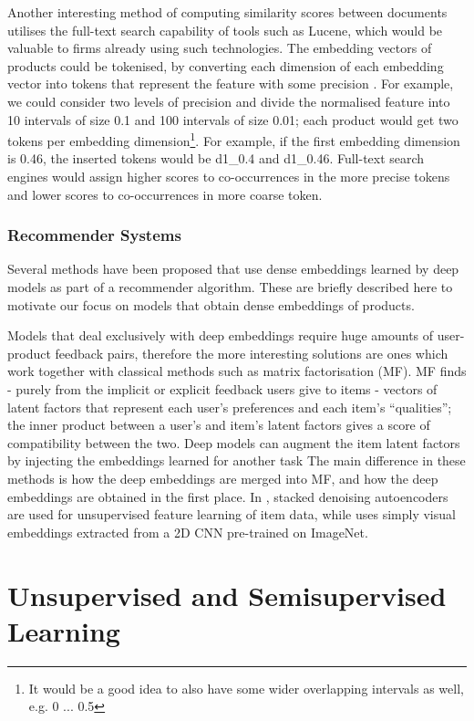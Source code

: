 Another interesting method of computing similarity scores between documents utilises the full-text search capability of tools such as Lucene, which would be valuable to firms already using such technologies.
The embedding vectors of products could be tokenised, by converting each dimension of each embedding vector into tokens that represent the feature with some precision \cite{vec_fulltext}.
For example, we could consider two levels of precision and divide the normalised feature into 10 intervals of size 0.1 and 100 intervals of size 0.01; each product would get two tokens per embedding dimension\footnote{It would be a good idea to also have some wider overlapping intervals as well, e.g. 0 ... 0.5}.
For example, if the first embedding dimension is 0.46, the inserted tokens would be d1\_0.4 and d1\_0.46.
Full-text search engines would assign higher scores to co-occurrences in the more precise tokens and lower scores to co-occurrences in more coarse token.

\subsubsection{Recommender Systems}
\label{rec}

Several methods have been proposed that use dense embeddings learned by deep models as part of a recommender algorithm.
These are briefly described here to motivate our focus on models that obtain dense embeddings of products.

Models that deal exclusively with deep embeddings \cite{mvdl} require huge amounts of user-product feedback pairs, therefore the more interesting solutions are ones which work together with classical methods such as matrix factorisation (MF).
MF finds - purely from the implicit or explicit feedback users give to items - vectors of latent factors that represent each user's preferences and each item's ``qualities''; the inner product between a user's and item's latent factors gives a score of compatibility between the two.
Deep models can augment the item latent factors by injecting the embeddings learned for another task
The main difference in these methods is how the deep embeddings are merged into MF, and how the deep embeddings are obtained in the first place.
In \cite{cdl}, stacked denoising autoencoders are used for unsupervised feature learning of item data, while \cite{dl_mf} uses simply visual embeddings extracted from a 2D CNN pre-trained on ImageNet.

\section{Unsupervised and Semisupervised Learning}
\label{unsup}

